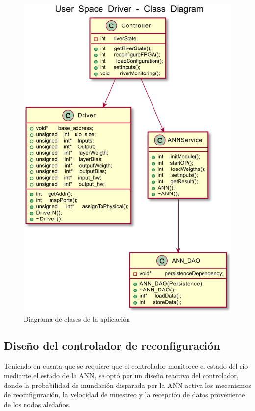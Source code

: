 \begin{figure}[!ht]
	\centering
		\includegraphics[scale=0.8]{Figures/driverANN}
	\caption{Diagrama de clases de la aplicación}
	\label{fig:userSpaceDriverModel}
\end{figure}

\subsection{Diseño del controlador de reconfiguración}

Teniendo en cuenta que se requiere que el controlador monitoree el estado del río mediante el estado de la ANN, se optó por un diseño reactivo del controlador, donde la probabilidad de inundación disparada por la ANN activa los mecanismos de reconfiguración, la velocidad de muestreo y la recepción de datos proveniente de los nodos aledaños.

